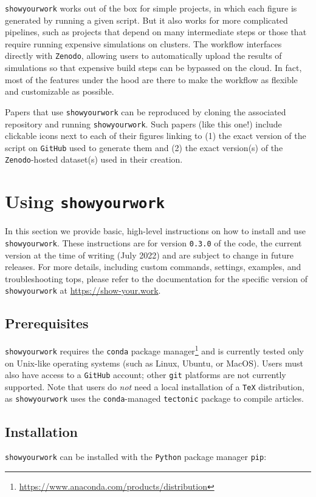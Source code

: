 \documentclass[modern]{aastex631}
\newcommand\syw{\texttt{showyourwork}\xspace}
\begin{document}
\syw works out of the box for simple projects, in which each figure is generated by running a given script. 
But it also works for more complicated pipelines, such as projects that depend on many intermediate steps or those that require running expensive simulations on clusters. 
The workflow interfaces directly with \texttt{Zenodo}, allowing users to automatically upload the results of simulations so that expensive build steps can be bypassed on the cloud. 
In fact, most of the features under the hood are there to make the workflow as flexible and customizable as possible.

Papers that use \syw can be reproduced by cloning the associated repository and running \syw. 
Such papers (like this one!) include clickable icons next to each of their figures linking to (1) the exact version of the script on \texttt{GitHub} used to generate them and (2) the exact version(s) of the \texttt{Zenodo}-hosted dataset(s) used in their creation.

\section{Using {\protect\syw}}
\label{sec:usage}
In this section we provide basic, high-level instructions on how to install and use \syw.
These instructions are for version \texttt{0.3.0} of the code, the current version at the time of writing (July 2022) and are subject to change in future releases.
For more details, including custom commands, settings, examples, and troubleshooting tops, please refer to the documentation for the specific version of \syw at \url{https://show-your.work}.

\subsection{Prerequisites}
\label{sec:usage:prereq}
\syw requires the \texttt{conda} package manager\footnote{\url{https://www.anaconda.com/products/distribution}} and is currently tested only on Unix-like operating systems (such as Linux, Ubuntu, or MacOS).
Users must also have access to a \texttt{GitHub} account; other \texttt{git} platforms are not currently supported.
Note that users do \emph{not} need a local installation of a \texttt{TeX} distribution, as \syw uses the \texttt{conda}-managed \texttt{tectonic} package to compile articles.

\subsection{Installation}
\label{sec:usage:install}
\syw can be installed with the \texttt{Python} package manager \texttt{pip}:\\
\end{document}
